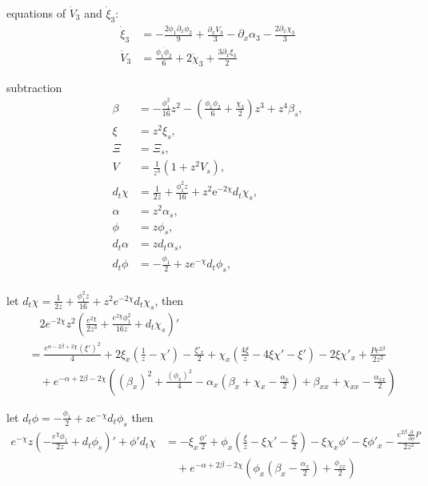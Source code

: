 \documentclass[12pt,a4paper]{article}
\numberwithin{equation}{section}
\begin{document}
equations of $\dot{V}_3$ and $\dot{\xi}_3$:
\begin{align}
    \dot{\xi}_3&=- \frac{2 \phi_{1} \partial_x \phi_{2}}{9} + \frac{\partial_x V_{3}}{3} - \partial_x \alpha_{3} - \frac{2 \partial_x \chi_{3}}{3}\\
    \dot{V}_3&=\frac{\phi_{1} \dot{\phi}_{2}}{6} + 2 \dot{\chi}_{3} + \frac{3 \partial_x \xi_{3}}{2}
\end{align}

subtraction
\begin{align}
    \beta&=-\frac{\phi_1^2}{16}z^2-\left(\frac{\phi_1\phi_2}{6}+\frac{\chi_3}{2}\right)z^3+z^4\beta_s, \\
    \xi&=z^2\xi_s, \\
    \Xi&=\Xi_s, \\
    V&=\frac{1}{z^{3}}(1+z^{2}V_{s}), \\
    d_{t}\chi&=\frac{1}{2z}+\frac{\phi_{1}^{2} z}{16}+z^{2}\mathrm{e}^{-2\chi}d_{t}\chi_{s}, \\
    \alpha&=z^2\alpha_s, \\
    \phi&=z\phi_s, \\
    d_t\alpha&=zd_t\alpha_s, \\
    d_t\phi&=-\frac{\phi_1}{2}+ze^{-\chi}d_t\phi_s, \\
\end{align}

let $d_t\chi=\frac{1}{2z}+\frac{\phi_1^2z}{16}+z^2e^{-2\chi}d_t\chi_s$, then
\begin{equation}
    \begin{aligned}
        &\quad 2e^{-2\chi}z^2 \left(\frac{e^{2\chi}}{2z^3}+\frac{e^{2\chi}\phi_1^2}{16z}+d_t\chi_s\right)'\\
        &= \frac{e^{\alpha- 2 \beta+2 \chi} \left(\xi'\right)^{2}}{4}+2 \xi_x \left(\frac{1}{z} - \chi'\right) - \frac{\xi'_x}{2} + \chi_x \left(\frac{4 \xi}{z} - 4 \xi \chi' - \xi'\right) - 2 \xi \chi'_x + \frac{P e^{2 \beta}}{2 z^{2}}\\
        &\quad + e^{- \alpha+2 \beta- 2 \chi} \left(\left(\beta_x\right)^{2} + \frac{\left(\phi_x\right)^{2}}{4} - \alpha_x \left(\beta_x + \chi_x - \frac{\alpha_x}{2}\right) + \beta_{xx} + \chi_{xx} - \frac{\alpha_{xx}}{2}\right)
    \end{aligned}
\end{equation}

let $d_t\phi=-\frac{\phi_1}{2}+ze^{-\chi}d_t\phi_s$ then
\begin{equation}
    \begin{aligned}
        e^{-\chi}z \left(-\frac{e^\chi\phi_1}{2z}+d_t\phi_s\right)'+\phi'd_t\chi &= - \xi_x \frac{\phi'}{2} + \phi_x \left(\frac{\xi}{z} - \xi \chi' - \frac{\xi'}{2}\right) - \xi \chi_x \phi' - \xi \phi'_x - \frac{e^{2 \beta} \frac{\partial}{\partial \phi} P}{2 z^{2}}\\
        &\quad + e^{- \alpha+2 \beta- 2 \chi} \left(\phi_x \left(\beta_x -\frac{\alpha_x}{2}\right) + \frac{\phi_{xx}}{2}\right)
    \end{aligned}
\end{equation}
\end{document}
